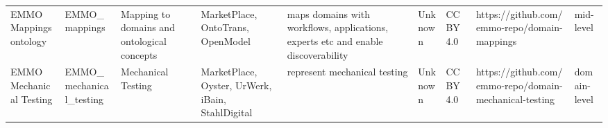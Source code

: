 \begin{tabular}{m{5cm}m{2cm}m{5cm}m{2cm}m{2cm}m{2cm}m{2cm}m{2cm}m{2cm}}
                                                           EMMO Mappings ontology &           EMMO_mappings & Mapping to domains and ontological concepts &                                                                                                                                                                                                                                                                                                                                    MarketPlace, OntoTrans, OpenModel &                                                                                                                                                                                                                                                                                                                      maps domains with workflows, applications, experts etc and enable discoverability &                                                                                                            Unknown &                                    CC BY 4.0 &                                                      https://github.com/emmo-repo/domain-mappings  &         mid-level \\
                                                          EMMO Mechanical Testing & EMMO_mechanical_testing &                          Mechanical Testing &                                                                                                                                                                                                                                                                                                                     MarketPlace, Oyster, UrWerk, iBain, StahlDigital &                                                                                                                                                                                                                                                                                                                                                                           represent mechanical testing &                                                                                                            Unknown &                                    CC BY 4.0 &                                            https://github.com/emmo-repo/domain-mechanical-testing  &      domain-level \\

\end{tabular}
